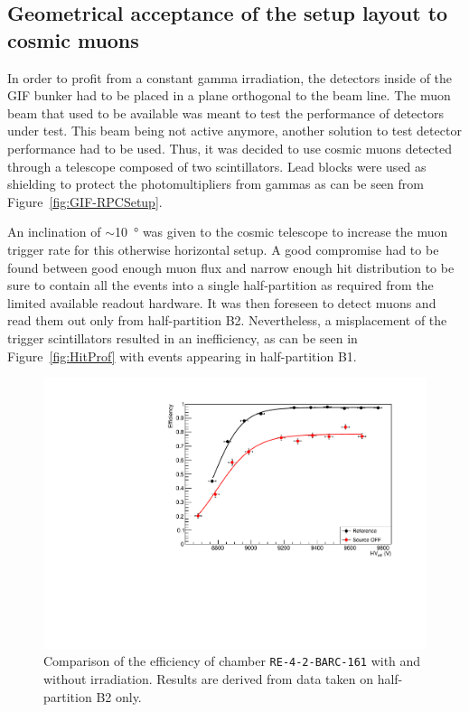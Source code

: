\endgroup
	
	\subsection{Geometrical acceptance of the setup layout to cosmic muons}
	\label{chapt5:ssec:GeoAcc}
				
	In order to profit from a constant gamma irradiation, the detectors inside of the GIF bunker had to be placed in a plane orthogonal to the beam line. The muon beam that used to be available was meant to test the performance of detectors under test. This beam being not active anymore, another solution to test detector performance had to be used. Thus, it was decided to use cosmic muons detected through a telescope composed of two scintillators. Lead blocks were used as shielding to protect the photomultipliers from gammas as can be seen from Figure~\ref{fig:GIF-RPCSetup}.
				
	An inclination of $\sim$\SI{10}{\degree} was given to the cosmic telescope to increase the muon trigger rate for this otherwise horizontal setup. A good compromise had to be found between good enough muon flux and narrow enough hit distribution to be sure to contain all the events into a single half-partition as required from the limited available readout hardware. It was then foreseen to detect muons and read them out only from half-partition B2. Nevertheless, a misplacement of the trigger scintillators resulted in an inefficiency, as can be seen in Figure~\ref{fig:HitProf} with events appearing in half-partition B1.
	
\newpage
	
\begingroup\setlength{\intextsep}{5pt}\setlength{\columnsep}{15pt}
	
	\begin{figure}
            \centering
		\includegraphics[width = \linewidth]{fig/chapt5/Compared-Efficiency.pdf}
		\caption{\label{fig:EffCompar} Comparison of the efficiency of chamber \texttt{RE-4-2-BARC-161} with and without irradiation. Results are derived from data taken on half-partition B2 only.}
	\end{figure}
	
